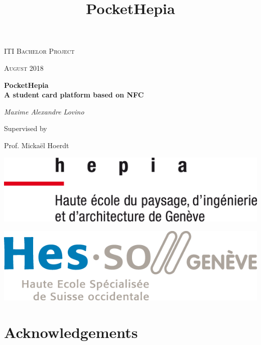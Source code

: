 \documentclass[11pt,a4paper]{report}
\title{PocketHepia}
\begin{document}
\begin{titlepage}
	\centering
	{\scshape \LARGE ITI Bachelor Project \par}
	\vspace{1cm}
	{\scshape\Large August 2018\par}
	\vspace{1.5cm}
	{\huge\bfseries PocketHepia\\A student card platform based on NFC \par}
	\vspace{2cm}
	{\Large\itshape Maxime Alexandre Lovino\par}
	\vfill
	Supervised by\par
	Prof. Mickaël Hoerdt
	\vfill
		\begin{minipage}{.5\textwidth}
		\centering
		\includegraphics[width=.7\linewidth]{assets/logo_hepia.png}
	\end{minipage}%
	\begin{minipage}{.5\textwidth}
		\centering
		\includegraphics[width=.7\linewidth]{assets/logo_hes.png}
	\end{minipage}
\end{titlepage}
\shipout\null
{}
\tableofcontents
\newpage
\listoffigures
\newpage
\chapter*{Acknowledgements}
\glsaddall
\printglossary[title=Terms and Definitions]
\newpage
\shipout\null
{}
\end{document}
